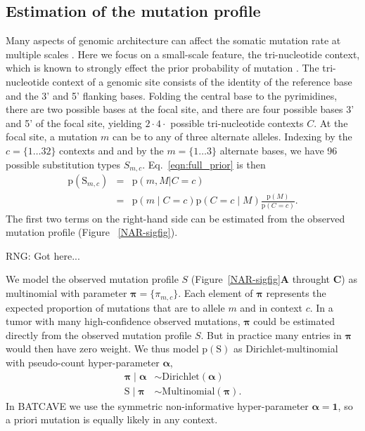 \documentclass[a4,center,fleqn]{NAR}
\newcommand{\rngcomment}[1]{{\color{red}RNG: #1}}
\newcommand{\batcave}{BATCAVE }
\begin{document}
\subsection{Estimation of the mutation profile}
Many aspects of genomic architecture can affect the somatic mutation rate at multiple scales \cite{Buisson2019}.
Here we focus on a small-scale feature, the tri-nucleotide context, which is known to strongly effect the prior probability of mutation \citep{Nik-Zainal2012a,Alexandrov2015,Lee-Six2018}.
The tri-nucleotide context of a genomic site consists of the identity of the reference base and the 3' and 5' flanking bases.
Folding the central base to the pyrimidines, there are two possible bases at the focal site, and there are four possible bases 3' and 5' of the focal site, yielding $2 \cdot 4 \cdot$ possible tri-nucleotide contexts $C$.
At the focal site, a mutation $m$ can be to any of three alternate alleles.
Indexing by the $c=\{1 \dots 32\}$ contexts and and by the $m = \{1 \dots 3\}$ alternate bases, we have 96 possible substitution types $S_{m,c}$.
Eq.~\ref{eqn:full_prior} is then
\begin{equation}
  \label{eqn:detailed_prior}
  \begin{array}{rcl}
  \mathrm{p}(\mathrm{S}_{m,c}) &=&  \mathrm{p}(m, M | C = c) \\
                            &=& \mathrm{p}(m \mid C = c) \mathrm{p}(C = c \mid M)\frac{\mathrm{p}(M)}{\mathrm{p}(C = c)}.
  \end{array}
\end{equation}
The first two terms on the right-hand side can be estimated from the observed mutation profile (Figure ~\ref{NAR-sigfig}).

\rngcomment{Got here...}

We model the observed mutation profile $S$ (Figure~\ref{NAR-sigfig}\textbf{A} throught \textbf{C}) as multinomial with parameter $\boldsymbol{\pi} = \{\pi_{m,c}\}$.
Each element of $\boldsymbol{\pi}$ represents the expected proportion of mutations that are to allele $m$ and in context $c$.
In a tumor with many high-confidence observed mutations, $\boldsymbol{\pi}$ could be estimated directly from the observed mutation profile $S$.
But in practice many entries in $\boldsymbol{\pi}$ would then have zero weight.
We thus model $\mathrm{p}(\mathrm{S})$ as Dirichlet-multinomial with pseudo-count hyper-parameter $\boldsymbol{\alpha}$, 
$$
\begin{aligned}
  \boldsymbol{\pi} \mid \boldsymbol{\alpha} &\sim \textrm{Dirichlet}(\boldsymbol{\alpha}) \\
  \mathrm{S} \mid \boldsymbol{\pi} & \sim \textrm{Multinomial}(\boldsymbol{\pi}).
\end{aligned}
$$
In \batcave we use the symmetric non-informative hyper-parameter $\boldsymbol{\alpha} = \boldsymbol{1}$, so a priori mutation is equally likely in any context.
\end{document}
